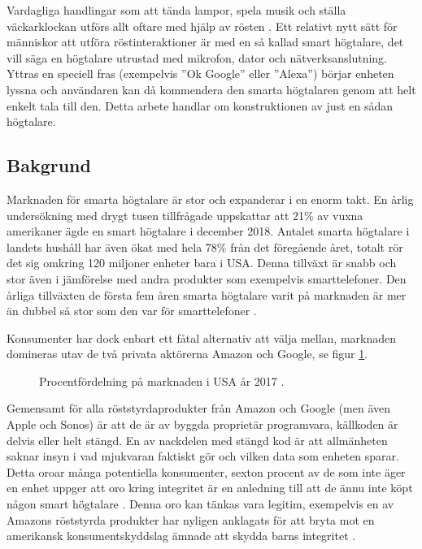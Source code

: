 Vardagliga handlingar som att tända lampor, spela musik och ställa väckar\-klockan utförs allt oftare med hjälp av rösten \cite{voicebot}. Ett relativt nytt sätt för människor att utföra röstinteraktioner är med en så kallad smart högtalare, det vill säga en högtalare utrustad med mikrofon, dator och nätverksanslutning. Yttras en speciell fras (exempelvis ”Ok Google” eller ”Alexa”) börjar enheten lyssna och användaren kan då kommendera den smarta högtalaren genom att helt enkelt tala till den. Detta arbete handlar om konstruktionen av just en sådan högtalare.

\subsection{Bakgrund}
Marknaden för smarta högtalare är stor och expanderar i en enorm takt. En årlig undersökning \cite{edison_npr2018} med drygt tusen tillfrågade uppskattar att 21\% av vuxna amerikaner ägde en smart högtalare i december 2018. Antalet smarta högtalare i landets hushåll har även ökat med hela 78\% från det föregående året, totalt rör det sig omkring 120 miljoner enheter bara i USA. Denna tillväxt är snabb och stor även i jämförelse med andra produkter som exempelvis smarttelefoner. Den årliga tillväxten de första fem åren smarta högtalare varit på marknaden är mer än dubbel så stor som den var för smarttelefoner \cite{capgemini}.

Konsumenter har dock enbart ett fåtal alternativ att välja mellan, marknaden domineras utav de två privata aktörerna Amazon och Google, se figur \ref{fig:speaker_market_share}. 
\begin{figure}[h]
    \centering
    \caption{\small Procentfördelning på marknaden i USA år 2017 \cite{voicebot}.}
    \label{fig:speaker_market_share}    
\end{figure}
Gemensamt för alla röststyrdaprodukter från Amazon och Google (men även Apple och Sonos) är att de är av byggda proprietär programvara, källkoden är delvis eller helt stängd. En av nackdelen med stängd kod är att allmänheten saknar insyn i vad mjukvaran faktiskt gör och vilken data som enheten sparar. Detta oroar många potentiella konsumenter, sexton procent av de som inte äger en enhet uppger att oro kring integritet är en anledning till att de ännu inte köpt någon smart högtalare \cite{voicebot}. Denna oro kan tänkas vara legitim, exempelvis en av Amazons röststyrda produkter har nyligen anklagats för att bryta mot en amerikansk konsumentskyddslag ämnade att skydda barns integritet \cite{intercept}.

